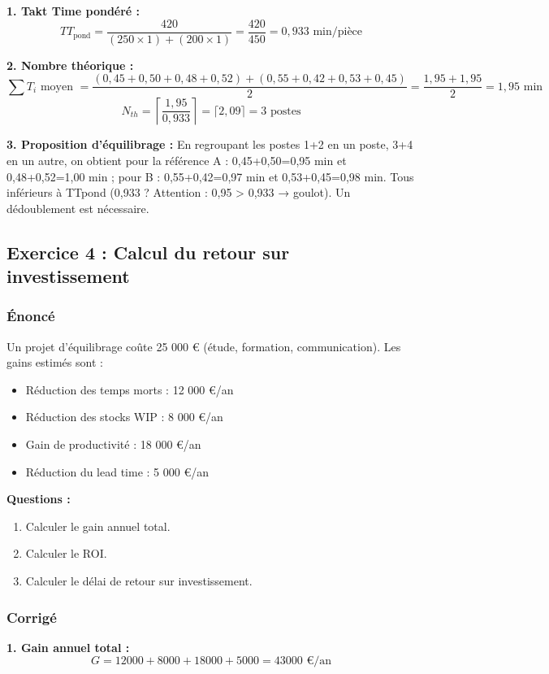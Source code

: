 \documentclass[12pt,a4paper]{article}
\begin{document}
\begin{center}
\textbf{1. Takt Time pondéré :}
\[
TT_{\text{pond}} = \frac{420}{(250 \times 1) + (200 \times 1)} = \frac{420}{450} = 0,933 \text{ min/pièce}
\]

\textbf{2. Nombre théorique :}
\[
\sum T_i \text{ moyen } = \frac{(0,45+0,50+0,48+0,52) + (0,55+0,42+0,53+0,45)}{2} = \frac{1,95 + 1,95}{2} = 1,95 \text{ min}
\]
\[
N_{th} = \left\lceil \frac{1,95}{0,933} \right\rceil = \lceil 2,09 \rceil = 3 \text{ postes}
\]

\textbf{3. Proposition d’équilibrage :}
En regroupant les postes 1+2 en un poste, 3+4 en un autre, on obtient pour la référence A : 0,45+0,50=0,95 min et 0,48+0,52=1,00 min ; pour B : 0,55+0,42=0,97 min et 0,53+0,45=0,98 min. Tous inférieurs à TTpond (0,933 ? Attention : 0,95 > 0,933 → goulot). Un dédoublement est nécessaire.

\subsection{Exercice 4 : Calcul du retour sur investissement}
\subsubsection{Énoncé}
Un projet d’équilibrage coûte 25 000 € (étude, formation, communication). Les gains estimés sont :
\begin{itemize}
    \item Réduction des temps morts : 12 000 €/an
    \item Réduction des stocks WIP : 8 000 €/an
    \item Gain de productivité : 18 000 €/an
    \item Réduction du lead time : 5 000 €/an
\end{itemize}

\textbf{Questions :}
\begin{enumerate}
    \item Calculer le gain annuel total.
    \item Calculer le ROI.
    \item Calculer le délai de retour sur investissement.
\end{enumerate}

\subsubsection{Corrigé}

\textbf{1. Gain annuel total :}
\[
G = 12 000 + 8 000 + 18 000 + 5 000 = 43 000 \text{ €/an}
\]


\end{center}
\end{document}
